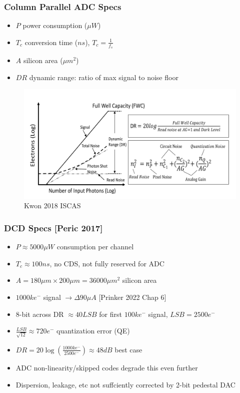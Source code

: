 \documentclass{beamer}
\begin{document}
\begin{frame}
    \frametitle{Column Parallel ADC Specs}
    \begin{itemize}
    \item $P$ power consumption ($\mu W$)
    \item $T_c$ conversion time ($ns$), $T_c=\frac{1}{f_s}$
    \item $A$ silicon area ($\mu m^2$)
    \item $DR$ dynamic range: ratio of max signal to noise floor
    \end{itemize}
    \begin{figure}
        \includegraphics[width=\textwidth]{dr.png}
        \caption{Kwon 2018 ISCAS}
    \end{figure}
\end{frame}

\begin{frame}
    \frametitle{DCD Specs [Peric 2017]}
    \begin{itemize}
    \item $P \approx 5000 \mu W$ consumption per channel
    \item $T_c \approx 100 ns$, no CDS, not fully reserved for ADC
    \item $A = 180\mu m\times 200\mu m = 36000\mu m^2$ silicon area
    \item $1000ke^-$ signal $\rightarrow \Delta 90\mu A$ [Prinker 2022 Chap 6]
    \item 8-bit across DR $\approx 40 LSB$ for first $100ke^-$ signal, $LSB=2500e^-$
    \item $\frac{LSB}{\sqrt{12}} \approx 720 e^-$ quantization error (QE)
    \item $DR = 20\log{(\frac{1000ke^-}{2500e^-})}\approx 48 dB$ best case
    \item ADC non-linearity/skipped codes degrade this even further
    \item Dispersion, leakage, etc not suffciently corrected by 2-bit pedestal DAC
    \end{itemize}
\end{frame}
\end{document}
